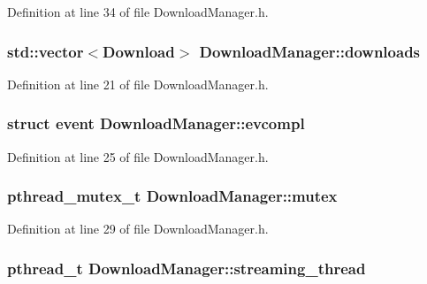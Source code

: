 Definition at line 34 of file DownloadManager.h.

\hypertarget{namespaceDownloadManager_acc325ba65ac10c7502cfda3c9e94b8c6}{
\subsubsection[{downloads}]{\setlength{\rightskip}{0pt plus 5cm}std::vector$<${\bf Download}$>$ {\bf DownloadManager::downloads}}}
\label{namespaceDownloadManager_acc325ba65ac10c7502cfda3c9e94b8c6}


Definition at line 21 of file DownloadManager.h.

\hypertarget{namespaceDownloadManager_a5c32639a9556b458f202030cf1618124}{
\subsubsection[{evcompl}]{\setlength{\rightskip}{0pt plus 5cm}struct event {\bf DownloadManager::evcompl}}}
\label{namespaceDownloadManager_a5c32639a9556b458f202030cf1618124}


Definition at line 25 of file DownloadManager.h.

\hypertarget{namespaceDownloadManager_ab2c641361cf79e8ab59d345508a48440}{
\subsubsection[{mutex}]{\setlength{\rightskip}{0pt plus 5cm}pthread\_\-mutex\_\-t {\bf DownloadManager::mutex}}}
\label{namespaceDownloadManager_ab2c641361cf79e8ab59d345508a48440}


Definition at line 29 of file DownloadManager.h.

\hypertarget{namespaceDownloadManager_ab3d18bc6835ffd77ae46b30bfd84dcce}{
\subsubsection[{streaming\_\-thread}]{\setlength{\rightskip}{0pt plus 5cm}pthread\_\-t {\bf DownloadManager::streaming\_\-thread}}}
\label{namespaceDownloadManager_ab3d18bc6835ffd77ae46b30bfd84dcce}


